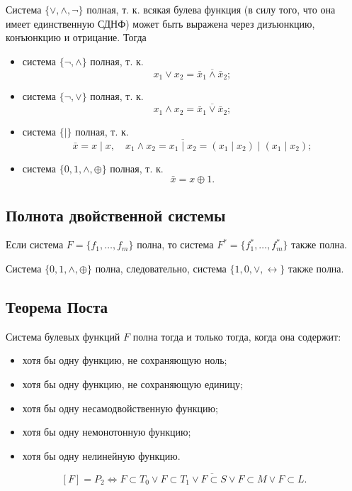 \begin{example*}
    Система \(\{\lor, \land, \neg\}\) полная, т. к. всякая булева функция (в силу того, что она имеет единственную СДНФ) может быть выражена через дизъюнкцию, конъюнкцию и отрицание. Тогда
    \begin{itemize}
        \item система \(\{\neg, \land\}\) полная, т. к.
              \[
                  x_1 \lor x_2 = \overline{\bar{x}_1 \land \bar{x}_2};
              \]
        \item система \(\{\neg, \lor\}\) полная, т. к.
              \[
                  x_1 \land x_2 = \overline{\bar{x}_1 \lor \bar{x}_2};
              \]
        \item система \(\{\mid\}\) полная, т. к.
              \[
                  \bar{x} = x \mid x,
                  \quad
                  x_1 \land x_2 = \overline{x_1 \mid x_2} = (x_1 \mid x_2) \mid (x_1 \mid x_2);
              \]
        \item система \(\{0, 1, \land, \oplus\}\) полная, т. к.
              \[
                  \bar{x} = x \oplus 1.
              \]
    \end{itemize}
\end{example*}

\subsection{Полнота двойственной системы}

\begin{theorem*}
    Если система \(F = \{f_1, \ldots, f_m\}\) полна, то система \(F^* = \{f_1^*, \ldots, f_m^*\}\) также полна.
\end{theorem*}

\begin{example*}
    Система \(\{0, 1, \land, \oplus\}\) полна, следовательно, система \(\{1, 0, \lor, \leftrightarrow\}\) также полна.
\end{example*}

\subsection{Теорема Поста}

\begin{theorem*}
    Система булевых функций \(F\) полна тогда и только тогда, когда она содержит:
    \begin{itemize}
        \item хотя бы одну функцию, не сохраняющую ноль;
        \item хотя бы одну функцию, не сохраняющую единицу;
        \item хотя бы одну несамодвойственную функцию;
        \item хотя бы одну немонотонную функцию;
        \item хотя бы одну нелинейную функцию.
    \end{itemize}

    \[
        [F] = P_2
        \iff
        \overline{F \subset T_0 \lor F \subset T_1 \lor F \subset S \lor F \subset M \lor F \subset L}.
    \]
\end{theorem*}

